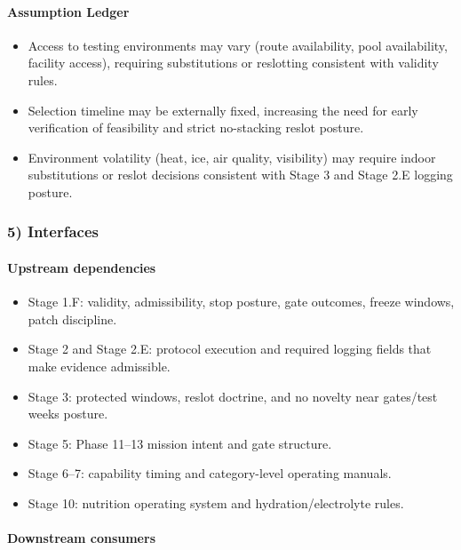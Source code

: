 \documentclass[10pt]{article}
\begin{document}
\paragraph*{Assumption Ledger}

\begin{itemize}
\item Access to testing environments may vary (route availability, pool availability, facility access), requiring substitutions or reslotting consistent with validity rules.
\item Selection timeline may be externally fixed, increasing the need for early verification of feasibility and strict no-stacking reslot posture.
\item Environment volatility (heat, ice, air quality, visibility) may require indoor substitutions or reslot decisions consistent with Stage 3 and Stage 2.E logging posture.
\end{itemize}

\subsubsection*{5) Interfaces}

\paragraph*{Upstream dependencies}

\begin{itemize}
\item Stage 1.F: validity, admissibility, stop posture, gate outcomes, freeze windows, patch discipline.
\item Stage 2 and Stage 2.E: protocol execution and required logging fields that make evidence admissible.
\item Stage 3: protected windows, reslot doctrine, and no novelty near gates/test weeks posture.
\item Stage 5: Phase 11–13 mission intent and gate structure.
\item Stage 6–7: capability timing and category-level operating manuals.
\item Stage 10: nutrition operating system and hydration/electrolyte rules.
\end{itemize}

\paragraph*{Downstream consumers}
\end{document}
